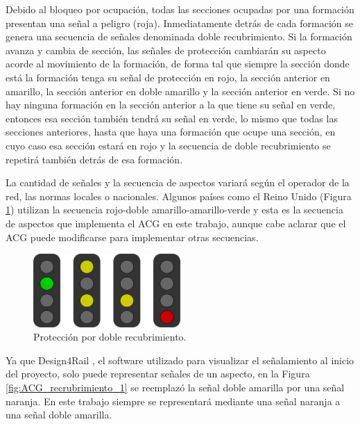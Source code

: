 	Debido al bloqueo por ocupación, todas las secciones ocupadas por una formación presentan una señal a peligro (roja). Inmediatamente detrás de cada formación se genera una secuencia de señales denominada doble recubrimiento. Si la formación avanza y cambia de sección, las señales de protección cambiarán su aspecto acorde al movimiento de la formación, de forma tal que siempre la sección donde está la formación tenga su señal de protección en rojo, la sección anterior en amarillo, la sección anterior en doble amarillo y la sección anterior en verde. Si no hay ninguna formación en la sección anterior a la que tiene su señal en verde, entonces esa sección también tendrá su señal en verde, lo mismo que todas las secciones anteriores, hasta que haya una formación que ocupe una sección, en cuyo caso esa sección estará en rojo y la secuencia de doble recubrimiento se repetirá también detrás de esa formación.
	 
	La cantidad de señales y la secuencia de aspectos variará según el operador de la red, las normas locales o nacionales. Algunos países como el Reino Unido \cite{UK} (Figura \ref{fig:uk_signalling}) utilizan la secuencia rojo-doble amarillo-amarillo-verde y esta es la secuencia de aspectos que implementa el ACG en este trabajo, aunque cabe aclarar que el ACG puede modificarse para implementar otras secuencias. 
	
	\begin{figure}[!h]
		\centering
		\includegraphics[width=0.5\textwidth]{Figuras/semaforo2}
		\centering\caption{Protección por doble recubrimiento.}
		\label{fig:uk_signalling}
	\end{figure}
	
	Ya que Design4Rail \cite{DESIGN4RAIL}, el software utilizado para visualizar el señalamiento al inicio del proyecto, solo puede representar señales de un aspecto, en la Figura \ref{fig:ACG_recrubrimiento_1} se reemplazó la señal doble amarilla por una señal naranja. En este trabajo siempre se representará mediante una señal naranja a una señal doble amarilla.

	
	